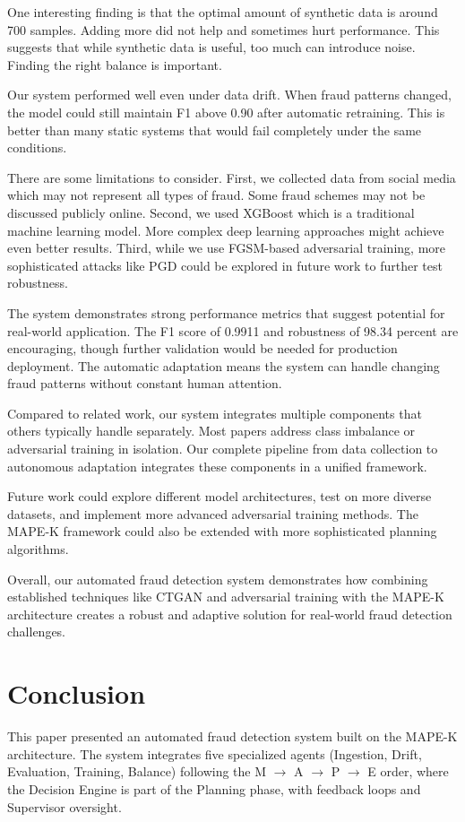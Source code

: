 \documentclass{svproc}
\begin{document}
One interesting finding is that the optimal amount of synthetic data is around 700 samples. Adding more did not help and sometimes hurt performance. This suggests that while synthetic data is useful, too much can introduce noise. Finding the right balance is important.

Our system performed well even under data drift. When fraud patterns changed, the model could still maintain F1 above 0.90 after automatic retraining. This is better than many static systems that would fail completely under the same conditions.

There are some limitations to consider. First, we collected data from social media which may not represent all types of fraud. Some fraud schemes may not be discussed publicly online. Second, we used XGBoost which is a traditional machine learning model. More complex deep learning approaches might achieve even better results. Third, while we use FGSM-based adversarial training, more sophisticated attacks like PGD could be explored in future work to further test robustness.

The system demonstrates strong performance metrics that suggest potential for real-world application. The F1 score of 0.9911 and robustness of 98.34 percent are encouraging, though further validation would be needed for production deployment. The automatic adaptation means the system can handle changing fraud patterns without constant human attention.

Compared to related work, our system integrates multiple components that others typically handle separately. Most papers address class imbalance or adversarial training in isolation. Our complete pipeline from data collection to autonomous adaptation integrates these components in a unified framework.

Future work could explore different model architectures, test on more diverse datasets, and implement more advanced adversarial training methods. The MAPE-K framework could also be extended with more sophisticated planning algorithms.

Overall, our automated fraud detection system demonstrates how combining established techniques like CTGAN and adversarial training with the MAPE-K architecture creates a robust and adaptive solution for real-world fraud detection challenges.

\section{Conclusion}\label{sec:conclusion}
This paper presented an automated fraud detection system built on the MAPE-K architecture. The system integrates five specialized agents (Ingestion, Drift, Evaluation, Training, Balance) following the M $\rightarrow$ A $\rightarrow$ P $\rightarrow$ E order, where the Decision Engine is part of the Planning phase, with feedback loops and Supervisor oversight.
\end{document}
